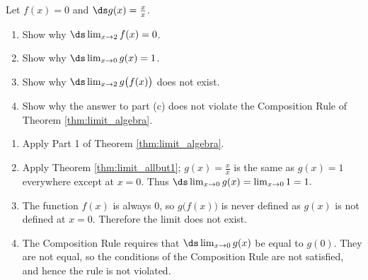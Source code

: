 {Let $f(x) = 0$ and $\ds g(x) = \frac xx$. 
\begin{enumerate}
	\item Show why $\ds \lim_{x\to2} f(x)=0$.
	\item	Show why $\ds \lim_{x\to0} g(x) = 1$.
	\item	Show why $\ds \lim_{x\to2} g\big(f(x)\big)$ does not exist.
	\item	Show why the answer to part (c) does not violate the Composition Rule of Theorem \ref{thm:limit_algebra}.
\end{enumerate}}
{\begin{enumerate}
	\item Apply Part 1 of Theorem \ref{thm:limit_algebra}.
	\item	Apply Theorem \ref{thm:limit_allbut1}; $g(x) = \frac xx$ is the same as $g(x) = 1$ everywhere except at $x=0$. Thus $\ds\lim_{x\to0} g(x) = \lim_{x\to 0} 1 = 1.$
	\item	The function $f(x)$ is always 0, so $g\big(f(x)\big)$ is never defined as $g(x)$ is not defined at $x=0$. Therefore the limit does not exist.
	\item	The Composition Rule requires that $\ds\lim_{x\to0} g(x)$ be equal to $g(0)$. They are not equal, so the conditions of the Composition Rule are not satisfied, and hence the rule is not violated.
\end{enumerate}}


